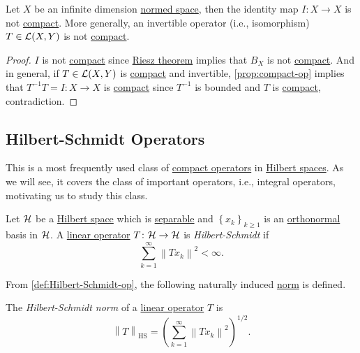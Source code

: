 \begin{corollary}\label{col:iso-are-not-compact}
	Let \(X\) be an infinite dimension \hyperref[def:normed-vector-space]{normed space}, then the identity map \(I\colon X\to X\) is not \hyperref[def:compact-op]{compact}. More generally, an invertible operator (i.e., isomorphism) \(T\in \mathcal{\MakeUppercase{l}} (X, Y)\) is not \hyperref[def:compact-op]{compact}.
\end{corollary}
\begin{proof}
	\(I\) is not \hyperref[def:compact-op]{compact} since \hyperref[thm:Riesz]{Riesz theorem} implies that \(B_X\) is not \hyperref[def:compact]{compact}. And in general, if \(T\in \mathcal{\MakeUppercase{l}} (X, Y)\) is \hyperref[def:compact-op]{compact} and invertible, \autoref{prop:compact-op} implies that \(T^{-1} T = I\colon X\to X\) is \hyperref[def:compact-op]{compact} since \(T^{-1} \) is bounded and \(T\) is \hyperref[def:compact-op]{compact}, contradiction.
\end{proof}

\subsection{Hilbert-Schmidt Operators}
This is a most frequently used class of \hyperref[def:compact-op]{compact operators} in \hyperref[def:Hilbert-space]{Hilbert spaces}. As we will see, it covers the class of important operators, i.e., integral operators, motivating us to study this class.

\begin{definition}\label{def:Hilbert-Schmidt-op}
	Let \(\mathcal{\MakeUppercase{h}} \) be a \hyperref[def:Hilbert-space]{Hilbert space} which is \hyperref[def:separable]{separable} and \(\left\{ x_k \right\} _{k\geq 1}\) is an \hyperref[def:orthonormal-system]{orthonormal} basis in \(\mathcal{\MakeUppercase{h}} \). A \hyperref[def:linear-map]{linear operator} \(T\colon \mathcal{\MakeUppercase{h}} \to \mathcal{\MakeUppercase{h}} \) is \emph{Hilbert-Schmidt} if
	\[
		\sum_{k=1}^{\infty} \left\lVert T x_{k} \right\rVert ^{2} < \infty.
	\]
\end{definition}

From \autoref{def:Hilbert-Schmidt-op}, the following naturally induced \hyperref[def:norm]{norm} is defined.

\begin{definition}\label{def:Hilbert-Schmidt-norm}
	The \emph{Hilbert-Schmidt norm} of a \hyperref[def:linear-map]{linear operator} \(T\) is
	\[
		\left\lVert T\right\rVert _{\mathrm{HS} } = \left( \sum_{k=1}^{\infty} \left\lVert T x_{k} \right\rVert ^2 \right) ^{1 / 2}.
	\]
\end{definition}

